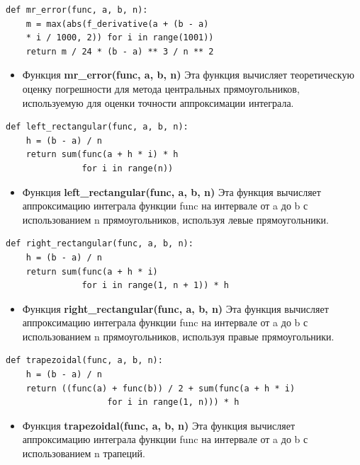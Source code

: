 \documentclass{article}
\begin{document}
\begin{lstlisting}
def mr_error(func, a, b, n):
    m = max(abs(f_derivative(a + (b - a) 
    * i / 1000, 2)) for i in range(1001))
    return m / 24 * (b - a) ** 3 / n ** 2
\end{lstlisting}


\begin{itemize}
\item Функция \textbf{mr\_error(func, a, b, n)} Эта функция вычисляет теоретическую оценку погрешности для метода центральных прямоугольников, используемую для оценки точности аппроксимации интеграла.
\end{itemize}


\begin{lstlisting}
def left_rectangular(func, a, b, n):
    h = (b - a) / n
    return sum(func(a + h * i) * h
               for i in range(n))
\end{lstlisting}

\begin{itemize}
\item Функция \textbf{left\_rectangular(func, a, b, n)} Эта функция вычисляет аппроксимацию интеграла функции func на интервале от a до b с использованием n прямоугольников, используя левые прямоугольники.
\end{itemize}

\begin{lstlisting}
def right_rectangular(func, a, b, n):
    h = (b - a) / n
    return sum(func(a + h * i)
               for i in range(1, n + 1)) * h
\end{lstlisting}

\begin{itemize}
\item Функция \textbf{right\_rectangular(func, a, b, n)} Эта функция вычисляет аппроксимацию интеграла функции func на интервале от a до b с использованием n прямоугольников, используя правые прямоугольники.
\end{itemize}

\begin{lstlisting}
def trapezoidal(func, a, b, n):
    h = (b - a) / n
    return ((func(a) + func(b)) / 2 + sum(func(a + h * i)
                    for i in range(1, n))) * h
\end{lstlisting}


\begin{itemize}
\item Функция \textbf{trapezoidal(func, a, b, n)} Эта функция вычисляет аппроксимацию интеграла функции func на интервале от a до b с использованием n трапеций.
\end{itemize}
\end{document}
